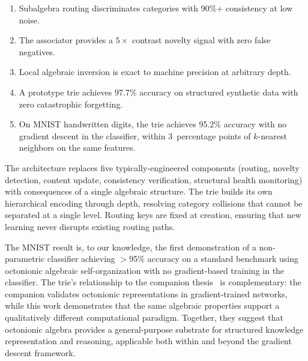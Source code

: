 \documentclass[11pt,a4paper]{article}
\theoremstyle{definition}
\theoremstyle{remark}
\begin{document}
\begin{enumerate}[nosep]
  \item Subalgebra routing discriminates categories with 90\%+ consistency at low noise.
  \item The associator provides a $5\times$ contrast novelty signal with zero false negatives.
  \item Local algebraic inversion is exact to machine precision at arbitrary depth.
  \item A prototype trie achieves 97.7\% accuracy on structured synthetic data with zero catastrophic forgetting.
  \item On MNIST handwritten digits, the trie achieves 95.2\% accuracy with no gradient descent in the classifier, within 3~percentage points of $k$-nearest neighbors on the same features.
\end{enumerate}

The architecture replaces five typically-engineered components (routing, novelty detection, content update, consistency verification, structural health monitoring) with consequences of a single algebraic structure. The trie builds its own hierarchical encoding through depth, resolving category collisions that cannot be separated at a single level. Routing keys are fixed at creation, ensuring that new learning never disrupts existing routing paths.

The MNIST result is, to our knowledge, the first demonstration of a non-parametric classifier achieving $>$95\% accuracy on a standard benchmark using octonionic algebraic self-organization with no gradient-based training in the classifier. The trie's relationship to the companion thesis~\citep{Escalera2026} is complementary: the companion validates octonionic representations in gradient-trained networks, while this work demonstrates that the same algebraic properties support a qualitatively different computational paradigm. Together, they suggest that octonionic algebra provides a general-purpose substrate for structured knowledge representation and reasoning, applicable both within and beyond the gradient descent framework.



\end{document}

